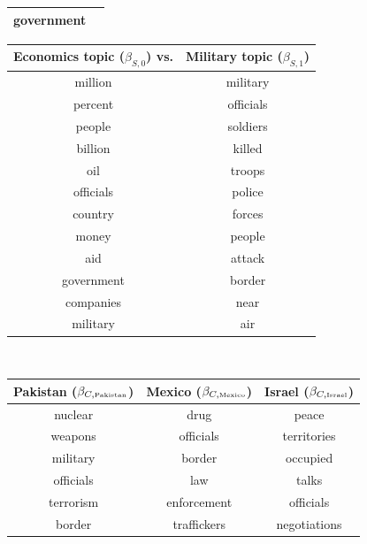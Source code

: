 \begin{table}
\begin{tabular}{|c|c|}
  government \\
  \hline
\end{tabular}
\hspace{30pt} \begin{tabular}{|cc|}
  \hline
  \textbf{Economics topic ($\beta_{S,0}$) vs.} &
  \textbf{Military topic ($\beta_{S,1}$)} \\
  \hline
  million & military \\
  percent & officials \\
  people & soldiers \\
  billion & killed \\
  oil & troops \\
  officials & police \\
  country & forces \\
  money & people \\
  aid & attack \\
  government & border \\
  companies & near \\
  military & air \\
  \hline
\end{tabular}
\\
\vspace{30pt}
\begin{tabular}{|c|c|c|}
  \hline
  \textbf{Pakistan ($\beta_{C,\mbox{\tiny Pakistan}}$)} &
  \textbf{Mexico ($\beta_{C,\mbox{\tiny Mexico}}$)} &
  \textbf{Israel ($\beta_{C,\mbox{\tiny Israel}}$)} \\
  \hline
  nuclear & drug & peace \\
  weapons & officials & territories \\
  military & border & occupied \\
  officials & law & talks \\
  terrorism & enforcement & officials \\
  border & traffickers & negotiations \\

\end{tabular}
\end{table}
